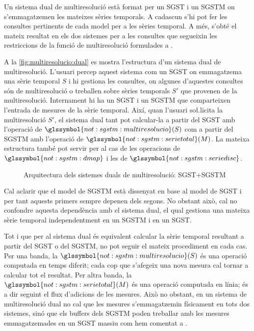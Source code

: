 Un sistema dual de multiresolució està format per un \gls{SGST} i un
\gls{SGSTM} on s'emmagatzemen les mateixes sèries temporals. A
cadascun s'hi pot fer les consultes pertinents de cada model per a les
sèries temporal. A més, s'obté el mateix resultat en els dos sistemes
per a les consultes que segueixin les restriccions de la funció de
multiresolució formulades a .


A la \autoref{fig:multiresolucio:dual} es mostra l'estructura d'un
sistema dual de multiresolució. L'usuari percep aquest sistema com un
\gls{SGST} on emmagatzema una sèrie temporal $S$ i hi gestiona les
consultes, on algunes d'aquestes consultes són de multiresolució o
treballen sobre sèries temporals $S'$ que provenen de la
multiresolució.  Internament hi ha un \gls{SGST} i un \gls{SGSTM} que
comparteixen l'entrada de mesures de la sèrie temporal. Així, quan
l'usuari so\l.licita la multiresolució $S'$, el sistema dual tant pot
calcular-la a partir del \gls{SGST} amb l'operació de
$\glssymbol{not:sgstm:multiresolucio}(S)$ com a partir del \gls{SGSTM}
amb l'operació de $\glssymbol{not:sgstm:serietotal}(M)$.  La mateixa
estructura també pot servir per al cas de les operacions de
$\glssymbol{not:sgstm:dmap}$ i les de
$\glssymbol{not:sgstm:seriedisc}$.


\begin{figure}
  \centering
  
  \caption{Arquitectura dels sistemes duals de multiresolució:
    \gls{SGST}+\gls{SGSTM}}
  \label{fig:multiresolucio:dual}
\end{figure}


Cal aclarir que el model de \gls{SGSTM} està dissenyat en base al
model de \gls{SGST} i per tant aquests primers sempre depenen dels
segons. No obstant això, cal no confondre aquesta dependència amb el
sistema dual, el qual gestiona una mateixa sèrie temporal independentment
en un \gls{SGSTM} i en un \gls{SGST}.




Tot i que per al sistema dual és equivalent calcular la sèrie temporal
resultant a partir del \gls{SGST} o del \gls{SGSTM}, no pot seguir el
mateix procediment en cada cas. Per una banda, la
$\glssymbol{not:sgstm:multiresolucio}(S)$ és una operació computada en
temps diferit; cada cop que s'afegeix una nova mesura cal tornar a
calcular tot el resultat. Per altra banda, la
$\glssymbol{not:sgstm:serietotal}(M)$ és una operació computada en
línia; és a dir seguint el flux d'adicions de les mesures.  Això no
obstant, en un sistema de multiresolució dual no cal que les mesures
s'emmagatzemin físicament en tots dos sistemes, sinó que els buffers
dels \gls{SGSTM} poden treballar amb les mesures emmagatzemades en un
\gls{SGST} massiu com hem comentat a
.


